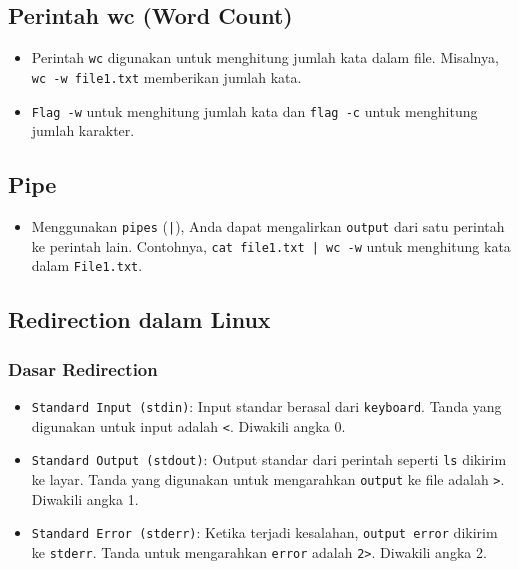 \documentclass{article}
\begin{document}
\subsection{Perintah wc (Word Count)}
\begin{itemize}
    \item Perintah \texttt{wc} digunakan untuk menghitung jumlah kata dalam file. Misalnya, \texttt{wc -w file1.txt} memberikan jumlah kata.
    \item \texttt{Flag -w} untuk menghitung jumlah kata dan \texttt{flag -c} untuk menghitung jumlah karakter.
\end{itemize}

\subsection{Pipe}
\begin{itemize}
    \item Menggunakan \texttt{pipes} (\texttt{|}), Anda dapat mengalirkan \texttt{output} dari satu perintah ke perintah lain. Contohnya, \texttt{cat file1.txt | wc -w} untuk menghitung kata dalam \texttt{File1.txt}.
\end{itemize}

\subsection{Redirection dalam Linux}

\subsubsection{Dasar Redirection}
\begin{itemize}
    \item \texttt{Standard Input (stdin)}: Input standar berasal dari \texttt{keyboard}. Tanda yang digunakan untuk input adalah \texttt{<}. Diwakili angka 0.
    \item \texttt{Standard Output (stdout)}: Output standar dari perintah seperti \texttt{ls} dikirim ke layar. Tanda yang digunakan untuk mengarahkan \texttt{output} ke file adalah \texttt{>}. Diwakili angka 1.
    \item \texttt{Standard Error (stderr)}: Ketika terjadi kesalahan, \texttt{output error} dikirim ke \texttt{stderr}. Tanda untuk mengarahkan \texttt{error} adalah \texttt{2>}. Diwakili angka 2.
\end{itemize}
\end{document}
